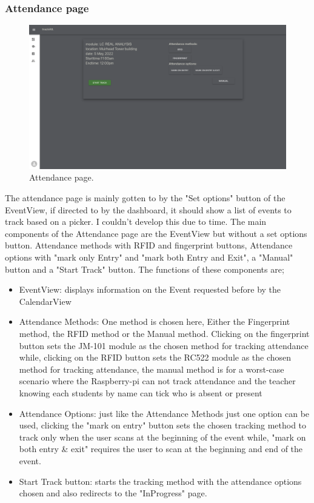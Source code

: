 \subsubsection{Attendance page}
\begin{figure}[ht!]
  \includegraphics[scale=0.135]{Design & Implementation/images/Attendance.png}
  \caption{Attendance page.}
\end{figure}
The attendance page is mainly gotten to by the "Set options" button of the EventView, if directed to by the dashboard, it should show a list of events to track based on a picker. I couldn't develop this due to time. The main components of the Attendance page are the EventView but without a set options button. Attendance methods with RFID and fingerprint buttons, Attendance options with "mark only Entry" and "mark both Entry and Exit", a "Manual" button and a "Start Track" button. The functions of these components are;

\begin{itemize}
  \item EventView: displays information on the Event requested before by the CalendarView
  \item Attendance Methods: One method is chosen here, Either the Fingerprint method, the RFID method or the Manual method. Clicking on the fingerprint button sets the JM-101 module as the chosen method for tracking attendance while, clicking on the RFID button sets the RC522 module as the chosen method for tracking attendance, the manual method is for a worst-case scenario where the Raspberry-pi can not track attendance and the teacher knowing each students by name can tick who is absent or present
  \item Attendance Options: just like the Attendance Methods just one option can be used, clicking the "mark on entry" button sets the chosen tracking method to track only when the user scans at the beginning of the event while, "mark on both entry \& exit" requires the user to scan at the beginning and end of the event.
  \item Start Track button: starts the tracking method with the attendance options chosen and also redirects to the "InProgress" page.  
\end{itemize}



